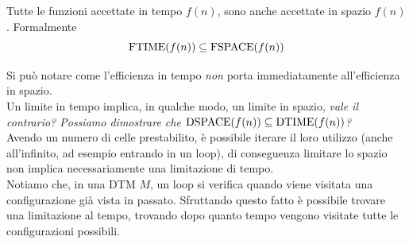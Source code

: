 \begin{theor}
	Tutte le funzioni accettate in tempo $f(n)$, sono anche accettate in spazio $f(n)$. Formalmente
	$$ \text{FTIME} (f(n)) \subseteq \text{FSPACE} (f(n)) $$
\end{theor}

Si può notare come l'efficienza in tempo \textit{non} porta immediatamente all'efficienza in spazio.\\

Un limite in tempo implica, in qualche modo, un limite in spazio, \textit{vale il contrario? Possiamo dimostrare che $\text{DSPACE} (f(n)) \subseteq \text{DTIME}(f(n))$?} \\

Avendo un numero di celle prestabilito, è possibile iterare il loro utilizzo (anche all'infinito, ad esempio entrando in un loop), di conseguenza limitare lo spazio non implica necessariamente una limitazione di tempo.\\

Notiamo che, in una DTM $M$, un loop si verifica quando viene visitata una configurazione già vista in passato. Sfruttando questo fatto è possibile trovare una limitazione al tempo, trovando dopo quanto tempo vengono visitate tutte le configurazioni possibili.\\

